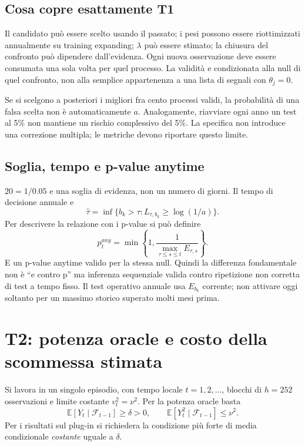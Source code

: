 \documentclass[11pt,a4paper]{article}
\theoremstyle{definition}\newtheorem{definition}[theorem]{Definizione}
\theoremstyle{remark}\newtheorem{remark}[theorem]{Osservazione}
\newcommand{\E}{\mathbb E}\newcommand{\PP}{\mathbb P}\newcommand{\R}{\mathbb R}
\newcommand{\F}{\mathcal F}\newcommand{\W}{\mathcal W}\newcommand{\supp}{\operatorname{supp}}
\begin{document}
\subsection{Cosa copre esattamente T1}
Il candidato può essere scelto usando il passato; i pesi possono essere riottimizzati annualmente su training expanding; $\lambda$ può essere stimato; la chiusura del confronto può dipendere dall'evidenza. Ogni nuova osservazione deve essere consumata una sola volta per quel processo. La validità e condizionata alla null di quel confronto, non alla semplice appartenenza a una lista di segnali con $\theta_j=0$.

Se si scelgono a posteriori i migliori fra cento processi validi, la probabilità di una falsa scelta non è automaticamente $a$. Analogamente, riavviare ogni anno un test al 5\% non mantiene un rischio complessivo del 5\%. La specifica non introduce una correzione multipla; le metriche devono riportare questo limite.

\subsection{Soglia, tempo e p-value anytime}
$20=1/0.05$ e una soglia di evidenza, non un numero di giorni. Il tempo di decisione annuale e
\begin{equation}
 \widehat\tau=\inf\{b_k>\tau:L_{\tau,b_k}\ge\log(1/a)\}.
\end{equation}
Per descrivere la relazione con i p-value si può definire
\begin{equation}
 p_t^{any}=\min\left\{1,\frac1{\max_{\tau\le s\le t}E_{\tau,s}}\right\}.
\end{equation}
E un p-value anytime valido per la stessa null. Quindi la differenza fondamentale non è ``e contro p'' ma inferenza sequenziale valida contro ripetizione non corretta di test a tempo fisso. Il test operativo annuale usa $E_{b_k}$ corrente; non attivare oggi soltanto per un massimo storico superato molti mesi prima.

\section{T2: potenza oracle e costo della scommessa stimata}
\label{sec:T2}
Si lavora in un singolo episodio, con tempo locale $t=1,2,\ldots$, blocchi di $h=252$ osservazioni e limite costante $v_t^2=\nu^2$. Per la potenza oracle basta
\begin{equation}
 \E[Y_t\mid\F_{t-1}]\ge\delta>0,\qquad
 \E[Y_t^2\mid\F_{t-1}]\le\nu^2.\label{eq:alternative}
\end{equation}
Per i risultati sul plug-in si richiedera la condizione più forte di media condizionale \emph{costante} uguale a $\delta$.
\end{document}
